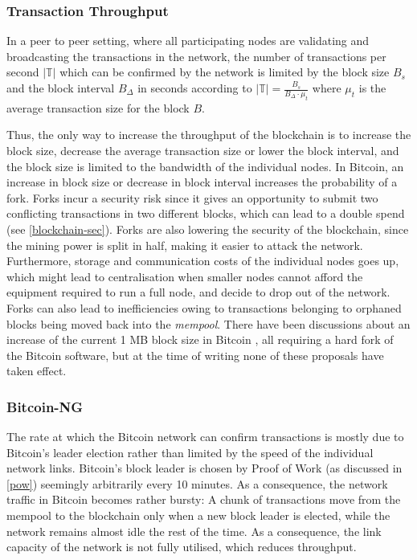 \documentclass{style/kththesis}
\begin{document}
\subsubsection{Transaction Throughput}
In a peer to peer setting, where all participating nodes are validating and broadcasting the transactions in the network, the number of transactions per second $|\mathbb{T}|$ which can be confirmed by the network is limited by the block size $B_s$ and the block interval $B_\Delta$ in seconds according to $|\mathbb{T}| = \frac{B_s}{B_\Delta \cdot \mu_t}$ where $\mu_t$ is the average transaction size for the block $B$. 

Thus, the only way to increase the throughput of the blockchain is to increase the block size, decrease the average transaction size or lower the block interval, and the block size is limited to the bandwidth of the individual nodes. In Bitcoin, an increase in block size or decrease in block interval increases the probability of a fork. Forks incur a security risk since it gives an opportunity to submit two conflicting transactions in two different blocks, which can lead to a double spend (see \cref{blockchain-sec}). Forks are also lowering the security of the blockchain, since the mining power is split in half, making it easier to attack the network.  Furthermore, storage and communication costs of the individual nodes goes up, which might lead to centralisation when smaller nodes cannot afford the equipment required to run a full node, and decide to drop out of the network. Forks can also lead to inefficiencies owing to transactions belonging to orphaned blocks being moved back into the \emph{mempool}. There have been discussions about an increase of the current 1 MB block size in Bitcoin \cite{BIP100, BIP101, BIP102, BIP103}, all requiring a hard fork of the Bitcoin software, but at the time of writing none of these proposals have taken effect.

\subsubsection{Bitcoin-NG}
The rate at which the Bitcoin network can confirm transactions is mostly due to Bitcoin's leader election rather than limited by the speed of the individual network links. Bitcoin's block leader is chosen by Proof of Work (as discussed in \cref{pow}) seemingly arbitrarily every 10 minutes. As a consequence, the network traffic in Bitcoin becomes rather bursty: A chunk of transactions move from the mempool to the blockchain only when a new block leader is elected, while the network remains almost idle the rest of the time. As a consequence, the link capacity of the network is not fully utilised, which reduces throughput. 
\end{document}
